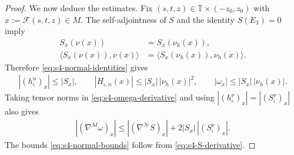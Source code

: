 \documentclass[a4paper,11pt,oneside,reqno]{amsart}
\numberwithin{equation}{section}
\theoremstyle{definition}
\begin{document}
\begin{proof}
    We now deduce the estimates. Fix
    $(s,t,z)\in\mathbb{T}\times(-z_0,z_0)$ with
    $x:=\mathcal{F}(s,t,z)\in M$.
    The self-adjointness of $S$ and the identity $S(E_3)=0$
    imply
    \begin{align*}
        S_x(\nu(x))&=S_x(\nu_h(x)),\\
        \langle S_x(\nu(x)),\nu(x)\rangle
        &=\langle S_x(\nu_h(x)),\nu_h(x)\rangle.
    \end{align*}
    Therefore \eqref{eq:s4-normal-identities} gives
    \begin{align*}
        |(h_\iota^n)_x|\leq |S_x|,
        \qquad
        |H_{\iota,n}(x)|\leq |S_x|\,|\nu_h(x)|^2,
        \qquad
        |\omega_x|\leq |S_x|\,|\nu_h(x)|.
    \end{align*}
    Taking tensor norms in \eqref{eq:s4-omega-derivative}
    and using $|(h_\iota^\nu)_x|=|(S_\iota^\nu)_x|$ also gives
    \begin{align*}
        |(\nabla^M\omega)_x|
        \leq |(\nabla^{\mathcal{N}}S)_x|
        +2|S_x|\,|(S_\iota^\nu)_x|.
    \end{align*}
    The bounds \eqref{eq:s4-normal-bounds} follow from
    \eqref{eq:s4-S-derivative}.
\end{proof}
%
\end{document}
